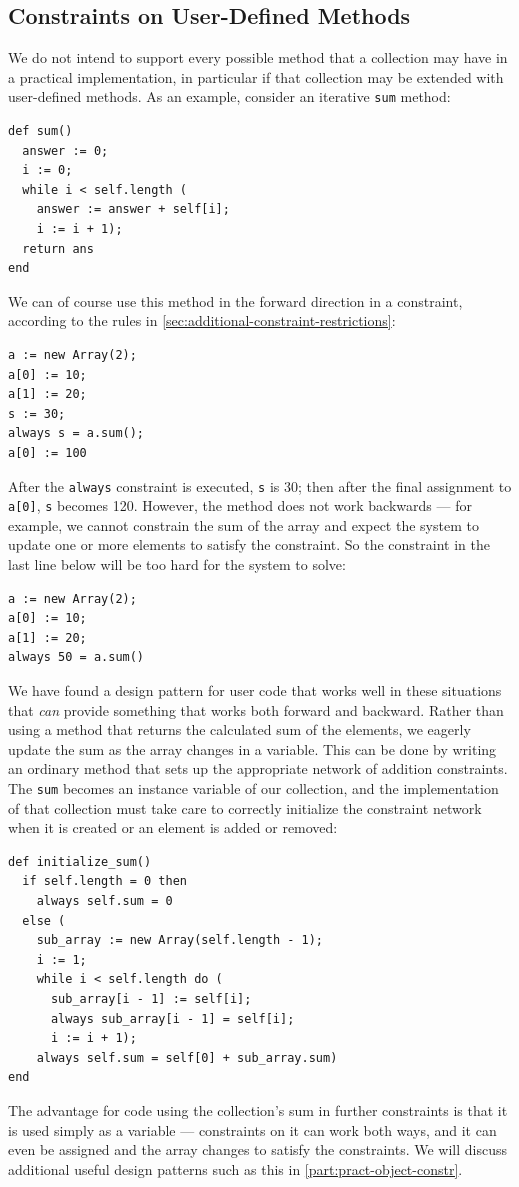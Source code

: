 \subsection{Constraints on User-Defined Methods}
\label{sec:constr-user-methods}

We do not intend to support every possible method that a collection
may have in a practical implementation, in particular if that
collection may be extended with user-defined methods. As an example,
consider an iterative \verb|sum| method:
\begin{lstlisting}
def sum()
  answer := 0;
  i := 0;
  while i < self.length (
    answer := answer + self[i];
    i := i + 1);
  return ans
end
\end{lstlisting}
We can of course use this method in the forward direction in a
constraint, according to the rules in
\autoref{sec:additional-constraint-restrictions}:
\begin{lstlisting}
a := new Array(2);
a[0] := 10;
a[1] := 20;
s := 30;
always s = a.sum();
a[0] := 100
\end{lstlisting}
After the \verb|always| constraint is executed, \verb|s| is 30; then
after the final assignment to \verb|a[0]|, \verb|s| becomes 120.
However, the method does not work backwards --- for example, we cannot
constrain the sum of the array and expect the system to update one or
more elements to satisfy the constraint.  So the constraint in the
last line below will be too hard for the system to solve:
\begin{lstlisting}
a := new Array(2);
a[0] := 10;
a[1] := 20;
always 50 = a.sum()
\end{lstlisting}

We have found a design pattern for user code that works well in these
situations that \emph{can} provide something that works both forward
and backward. Rather than using a method that returns the calculated
sum of the elements, we eagerly update the sum as the array changes in
a variable. This can be done by writing an ordinary method that sets
up the appropriate network of addition constraints. The \verb|sum|
becomes an instance variable of our collection, and the implementation
of that collection must take care to correctly initialize the
constraint network when it is created or an element is added or
removed:
\begin{lstlisting}
def initialize_sum()
  if self.length = 0 then
    always self.sum = 0
  else (
    sub_array := new Array(self.length - 1);
    i := 1;
    while i < self.length do (
      sub_array[i - 1] := self[i];
      always sub_array[i - 1] = self[i];
      i := i + 1);
    always self.sum = self[0] + sub_array.sum)
end
\end{lstlisting}
The advantage for code using the collection's sum in further
constraints is that it is used simply as a variable --- constraints on
it can work both ways, and it can even be assigned and the array
changes to satisfy the constraints. We will discuss additional useful
design patterns such as this in \autoref{part:pract-object-constr}.

